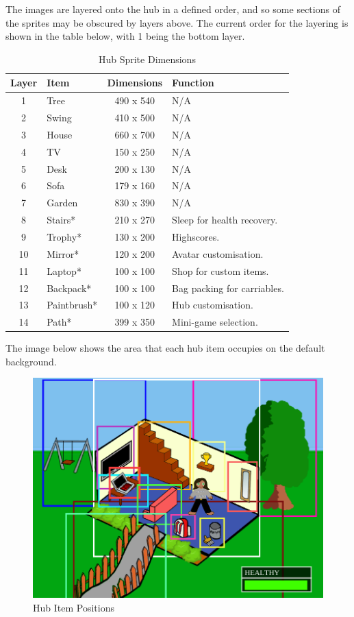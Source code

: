 \documentclass[a4paper,12pt]{article}
\begin{document}
The images are layered onto the hub in a defined order, and so some sections of the sprites may be obscured by layers above. The current order for the layering is shown in the table below, with 1 being the bottom layer.

\begin{table}[H]
	\centering
	\begin{tabular}{|c|l|c|l|}
		\hline
		Layer &	Item  		& Dimensions	& Function \\ \hline
		1 &		Tree		& 490 x 540		& N/A \\
		2 &		Swing		& 410 x 500		& N/A \\
		3 &		House		& 660 x 700		& N/A \\
		4 &		TV			& 150 x 250 	& N/A \\
		5 &		Desk		& 200 x 130		& N/A \\
		6 &		Sofa		& 179 x 160		& N/A \\
		7 &		Garden		& 830 x 390		& N/A \\
		8 &		Stairs*		& 210 x 270		& Sleep for health recovery. \\
		9 &		Trophy*		& 130 x 200		& Highscores. \\
		10 &	Mirror*		& 120 x 200		& Avatar customisation. \\
		11 &	Laptop*		& 100 x 100		& Shop for custom items. \\
		12 &	Backpack*	& 100 x 100		& Bag packing for carriables. \\
		13 &	Paintbrush*	& 100 x 120		& Hub customisation. \\
		14 &	Path*		& 399 x 350		& Mini-game selection. \\ \hline
	\end{tabular}
	\caption{Hub Sprite Dimensions}
	\label{tab:hub_dimensions}
\end{table}

The image below shows the area that each hub item occupies on the default background.

\begin{figure}[H]
	\captionsetup{justification=centering}
	\centering
	\includegraphics[width=0.80\linewidth]{hub_outlines}
	\caption{Hub Item Positions}
	\label{fig:hub_outlines}
\end{figure}
\end{document}
